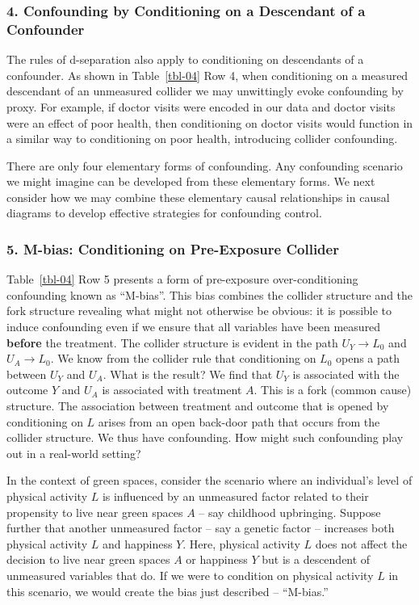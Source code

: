 \documentclass[
  singlecolumn]{article}
\begin{document}
\subsubsection{4. Confounding by Conditioning on a Descendant of a
Confounder}\label{confounding-by-conditioning-on-a-descendant-of-a-confounder}

The rules of d-separation also apply to conditioning on descendants of a
confounder. As shown in Table~\ref{tbl-04} Row 4, when conditioning on a
measured descendant of an unmeasured collider we may unwittingly evoke
confounding by proxy. For example, if doctor visits were encoded in our
data and doctor visits were an effect of poor health, then conditioning
on doctor visits would function in a similar way to conditioning on poor
health, introducing collider confounding.

There are only four elementary forms of confounding. Any confounding
scenario we might imagine can be developed from these elementary forms.
We next consider how we may combine these elementary causal
relationships in causal diagrams to develop effective strategies for
confounding control.

\subsubsection{5. M-bias: Conditioning on Pre-Exposure
Collider}\label{m-bias-conditioning-on-pre-exposure-collider}

Table~\ref{tbl-04} Row 5 presents a form of pre-exposure
over-conditioning confounding known as ``M-bias''. This bias combines
the collider structure and the fork structure revealing what might not
otherwise be obvious: it is possible to induce confounding even if we
ensure that all variables have been measured \textbf{before} the
treatment. The collider structure is evident in the path \(U_Y \to L_0\)
and \(U_A \to L_0\). We know from the collider rule that conditioning on
\(L_0\) opens a path between \(U_Y\) and \(U_A\). What is the result? We
find that \(U_Y\) is associated with the outcome \(Y\) and \(U_A\) is
associated with treatment \(A\). This is a fork (common cause)
structure. The association between treatment and outcome that is opened
by conditioning on \(L\) arises from an open back-door path that occurs
from the collider structure. We thus have confounding. How might such
confounding play out in a real-world setting?

In the context of green spaces, consider the scenario where an
individual's level of physical activity \(L\) is influenced by an
unmeasured factor related to their propensity to live near green spaces
\(A\) -- say childhood upbringing. Suppose further that another
unmeasured factor -- say a genetic factor -- increases both physical
activity \(L\) and happiness \(Y\). Here, physical activity \(L\) does
not affect the decision to live near green spaces \(A\) or happiness
\(Y\) but is a descendent of unmeasured variables that do. If we were to
condition on physical activity \(L\) in this scenario, we would create
the bias just described -- ``M-bias.''
\end{document}
